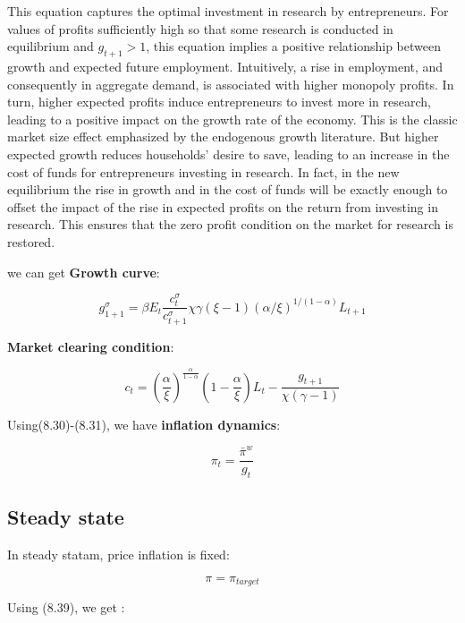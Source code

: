 \documentclass[cn,10pt,math=newtx,citestyle=gb7714-2015,bibstyle=gb7714-2015]{elegantbook}
\begin{document}
{{This equation captures the optimal investment in research by entrepreneurs. For values of profits sufficiently high so that some research is conducted in equilibrium and $g_{t+1}>1$, this equation implies a positive relationship between growth and expected future employment. Intuitively, a rise in employment, and consequently in aggregate demand, is associated with higher monopoly profits. In turn, higher expected profits induce entrepreneurs to invest more in research, leading to a positive impact on the growth rate of the economy. This is the classic market size effect emphasized by the endogenous growth literature. But higher expected growth reduces households’ desire to save, leading to an increase in the cost of funds for entrepreneurs investing in research. In fact, in the new equilibrium the rise in growth and in the cost of funds will be exactly enough to offset the impact of the rise in expected profits on the return from investing in research. This ensures that the zero profit condition on the market for research is restored.

we can get \textbf{Growth curve}:

\begin{equation}
g_{1+1}^{\sigma} = \beta E_t \frac{c_t^\sigma}{c_{t+1}^\sigma}\chi \gamma (\xi-1)(\alpha / \xi)^{1 /(1-\alpha)} L_{t+1}
\end{equation}

\textbf{Market clearing condition}:

\begin{equation}
	c_t =  \left(\frac{\alpha}{\xi}\right)^{\frac{\alpha}{1-\alpha}}\left(1-\frac{\alpha}{\xi}\right)L_t-\frac{g_{t+1}}{\chi(\gamma-1)}
\end{equation}

Using(8.30)-(8.31), we have \textbf{inflation dynamics}:

\begin{equation}
	\pi_t = \frac{\bar{\pi}^w}{g_t} 
\end{equation}

\subsection{Steady state}

In steady statam, price inflation is fixed:

\begin{equation}
	\pi = \pi_{target}
\end{equation}
 
 Using (8.39), we get :
 
}}
\end{document}
